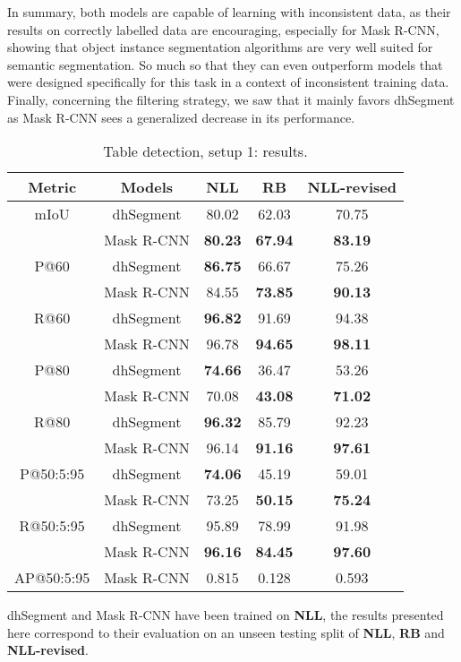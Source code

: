 In summary, both models are capable of learning with inconsistent data, as their results on correctly labelled data are encouraging, especially for Mask R-CNN, showing that object instance segmentation algorithms are very well suited for semantic segmentation. So much so that they can even outperform models that were designed specifically for this task in a context of inconsistent training data. Finally, concerning the filtering strategy, we saw that it mainly favors dhSegment as Mask R-CNN sees a generalized decrease in its performance. 


\begin{table}[htp]
\begin{center}
\begin{tabular}{cc|c|c|c}
Metric & Models & NLL & RB & NLL-revised \\
\hline
mIoU & dhSegment & 80.02 & 62.03 & 70.75\\
 & Mask R-CNN &  \textbf{80.23} &  \textbf{67.94} &  \textbf{83.19}\\
 \hline
P@60 & dhSegment &  \textbf{86.75} & 66.67 & 75.26\\
 & Mask R-CNN & 84.55 &  \textbf{73.85} &  \textbf{90.13}\\
  \hline
R@60 & dhSegment &  \textbf{96.82} & 91.69 & 94.38\\
 & Mask R-CNN & 96.78 &  \textbf{94.65} &  \textbf{98.11}\\
  \hline
P@80 & dhSegment &  \textbf{74.66} & 36.47 & 53.26\\
 & Mask R-CNN & 70.08 &  \textbf{43.08} &  \textbf{71.02}\\
 \hline
R@80 & dhSegment &  \textbf{96.32} & 85.79 & 92.23\\
 & Mask R-CNN & 96.14 &  \textbf{91.16} &  \textbf{97.61}\\
 \hline
 P@50:5:95 & dhSegment &  \textbf{74.06} & 45.19 & 59.01\\
 & Mask R-CNN & 73.25 &  \textbf{50.15} &  \textbf{75.24}\\
 \hline
 R@50:5:95 & dhSegment & 95.89 & 78.99 & 91.98\\
 & Mask R-CNN &  \textbf{96.16} &  \textbf{84.45} &  \textbf{97.60}\\
 \hline
  \hline
 AP@50:5:95 & Mask R-CNN & 0.815 & 0.128  & 0.593\\
  \hline
\end{tabular}
\end{center}
\caption{Table detection, setup 1: results.}
\medskip
\small
dhSegment and Mask R-CNN have been trained on \textbf{NLL}, the results presented here correspond to their evaluation on an unseen testing split of \textbf{NLL}, \textbf{RB} and \textbf{NLL-revised}.
\label{setup1_results}
\end{table}%

